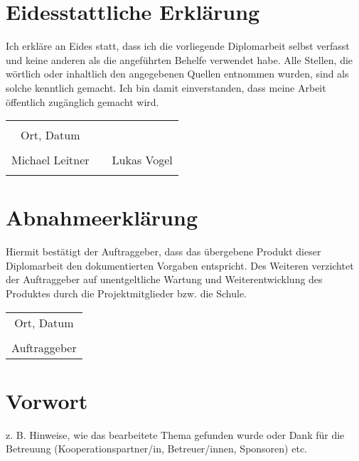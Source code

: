 \chapter*{Eidesstattliche Erklärung}
Ich erkläre an Eides statt, dass ich die vorliegende Diplomarbeit selbst verfasst und keine anderen als die angeführten Behelfe verwendet habe. Alle Stellen, die wörtlich oder inhaltlich den angegebenen Quellen entnommen wurden, sind als solche kenntlich gemacht.
Ich bin damit einverstanden, dass meine Arbeit öffentlich zugänglich gemacht wird.

\vspace{1cm}
\begin{tabular}{c c c}
	& \hspace{4cm} & \\\cline{1-1}
	Ort, Datum & & \\
	\vspace{2cm}
	& & \\\cline{1-1}\cline{3-3}
	Michael Leitner & & Lukas Vogel \\ 
	\vspace{2cm}

\end{tabular}

\chapter*{Abnahmeerklärung}
Hiermit bestätigt der Auftraggeber, dass das übergebene Produkt dieser Diplomarbeit den dokumentierten Vorgaben entspricht. Des Weiteren verzichtet der Auftraggeber auf unentgeltliche Wartung und Weiterentwicklung des Produktes durch die Projektmitglieder bzw. die Schule.

\vspace{1cm}
\begin{tabular}{c}
	\\\cline{1-1}
	Ort, Datum\\
	\vspace{2cm}
	\\\cline{1-1}
	Auftraggeber
\end{tabular}	

\chapter*{Vorwort}
z. B. Hinweise, wie das bearbeitete Thema gefunden wurde oder Dank für die Betreuung (Kooperationspartner/in, Betreuer/innen, Sponsoren) etc.



